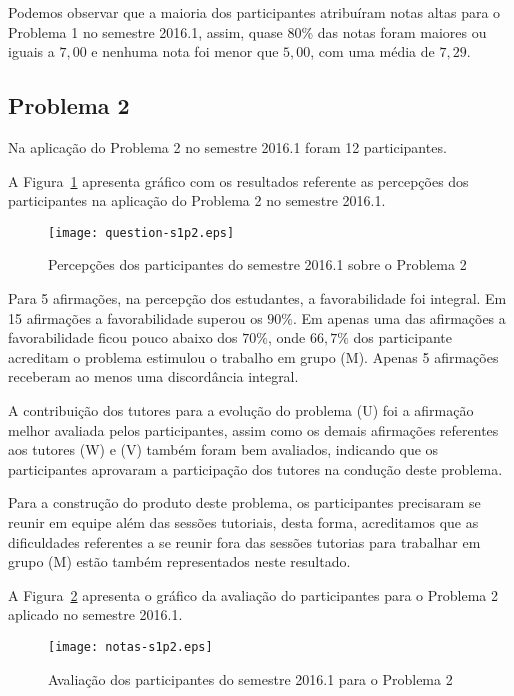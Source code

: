 Podemos observar que a maioria dos participantes atribuíram
notas altas para o Problema 1 no semestre 2016.1, assim, quase $80\%$ das notas
foram maiores ou iguais a $7,00$ e nenhuma nota foi menor que $5,00$, com uma média
de $7,29$.
  
\subsection{Problema 2}
Na aplicação do Problema 2 no semestre 2016.1 foram 12 participantes.

A Figura~\ref{percep-s1p2} apresenta gráfico com os resultados referente
as percepções dos participantes na aplicação do
Problema 2 no semestre 2016.1.

\begin{figure}[!htb]
\centering
\texttt{[image: question-s1p2.eps]}
\caption{Percepções dos participantes do semestre 2016.1 sobre o Problema 2}
\label{percep-s1p2}
\end{figure}

Para 5 afirmações, na percepção dos estudantes, a favorabilidade foi integral.
Em 15 afirmações a favorabilidade superou os $90\%$.
Em apenas uma das afirmações a favorabilidade ficou pouco abaixo dos $70\%$, onde
$66,7\%$ dos participante acreditam o problema estimulou
o trabalho em grupo (M).
Apenas 5 afirmações receberam ao menos uma discordância integral.

A contribuição dos tutores para a evolução do problema (U) foi a
afirmação melhor avaliada pelos participantes, assim como os demais
afirmações referentes aos tutores (W) e (V) também foram bem avaliados,
indicando que os participantes aprovaram a participação
dos tutores na condução deste problema.

Para a construção do produto deste problema, os participantes
precisaram se reunir em equipe além das sessões tutoriais, desta forma,
acreditamos que as dificuldades referentes a se reunir fora das sessões tutorias
para trabalhar em grupo (M) estão também representados neste resultado.

A Figura~\ref{aval-s1p2} apresenta o gráfico da
avaliação do participantes para o Problema 2 aplicado no semestre 2016.1.

\begin{figure}[!htb]
\centering
\texttt{[image: notas-s1p2.eps]}
\caption{Avaliação dos participantes do semestre 2016.1 para o Problema 2}
\label{aval-s1p2}
\end{figure}

